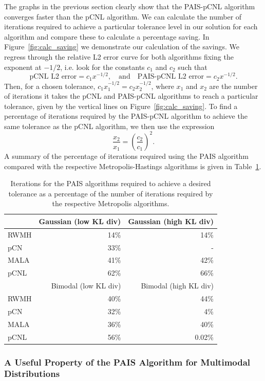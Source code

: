 \documentclass[final]{siamltex}
\begin{document}
The graphs in the previous section clearly show that the PAIS-pCNL algorithm converges faster than the pCNL algorithm. We can calculate the number of iterations required to achieve a particular tolerance level in our solution for each algorithm and compare these to calculate a percentage saving. In Figure~\ref{fig:calc_saving} we demonstrate our calculation of the savings. We regress through the relative L2 error curve for both algorithms fixing the exponent at $-1/2$, i.e. look for the constants $c_1$ and $c_2$ such that
\[
	\text{pCNL L2 error} = c_1x^{-1/2}, \quad \text{and} \quad \text{PAIS-pCNL L2 error} = c_2x^{-1/2}.
\]
Then, for a chosen tolerance, $c_1x_1^{-1/2} = c_2x_2^{-1/2}$, where $x_1$ and $x_2$ are the number of iterations it takes the pCNL and PAIS-pCNL algorithms to reach a particular tolerance, given by the vertical lines on Figure~\ref{fig:calc_saving}. To find a percentage of iterations required by the PAIS-pCNL algorithm to achieve the same tolerance as the pCNL algorithm, we then use the expression
\[
	\frac{x_2}{x_1} = \left(\frac{c_2}{c_1}\right)^2.
\]
A summary of the percentage of iterations required using the PAIS algorithm compared with the respective Metropolis-Hastings algorithms is given in Table~\ref{table:calc_savings}.

\begin{table}[!h]
\centering
\begin{tabular}{|l|r|r|}
\hline
		& Gaussian (low KL div) & Gaussian (high KL div) \\ \hline
	RWMH & 14\% & 14\% \\
	pCN & 33\% & - \\
	MALA & 41\% & 42\% \\
	pCNL & 62\% & 66\% \\ \hline
		& Bimodal (low KL div) & Bimodal (high KL div) \\ \hline
	RWMH & 40\% & 44\% \\
	pCN & 32\% & 4\% \\
	MALA & 36\% & 40\% \\
	pCNL & 56\% & 0.02\% \\ \hline
\end{tabular}
\caption{Iterations for the PAIS algorithms required to achieve a desired tolerance as a percentage of the number of iterations required by the respective Metropolis algorithms.}
\label{table:calc_savings}
\end{table}

\subsubsection{A Useful Property of the PAIS Algorithm for Multimodal Distributions}
\end{document}
